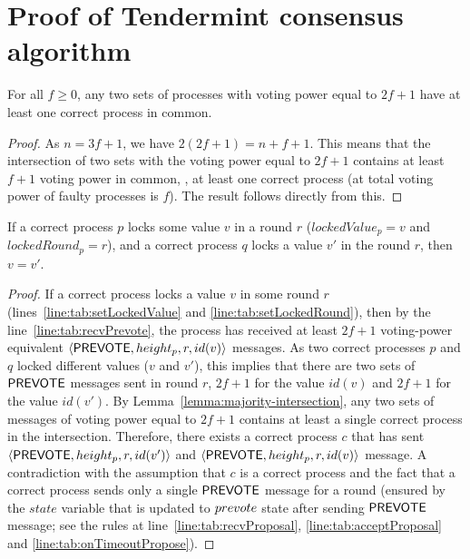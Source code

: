 \section{Proof of Tendermint consensus algorithm}
\label{sec:proof}

\begin{lemma}
	\label{lemma:majority-intersection}
	For all $f\geq 0$, any two sets of processes with voting power equal to $2f+1$ have
	at least one correct process in common.
\end{lemma}

\begin{proof}
	As $n=3f+1$, we have $2(2f+1) = n+f+1$.
	This means that the intersection of two sets with the voting power equal to $2f+1$ contains at least $f+1$ voting power in common, \ie, at least one correct process (at total voting power of faulty processes is $f$). The result follows directly from this.
\end{proof}

\begin{lemma}
	\label{lemma:locking-value}
	If a correct process $p$ locks some value $v$ in a round $r$ ($lockedValue_p = v$ and $lockedRound_p = r$), and a correct process $q$ locks a value $v'$ in the round $r$, then $v = v'$.
\end{lemma}

\begin{proof}
If a correct process locks a value $v$ in some round $r$ (lines~\ref{line:tab:setLockedValue} and \ref{line:tab:setLockedRound}), then by the line~\ref{line:tab:recvPrevote}, the process has received at least $2f+1$ voting-power equivalent $\langle\mathsf{PREVOTE},height_p, r,id(v)\rangle$ messages. As two correct processes $p$ and $q$ locked different values ($v$ and $v'$), this implies that there are two sets of $\mathsf{PREVOTE}$ messages sent in round $r$, $2f+1$ for the value $id(v)$ and $2f+1$ for the value $id(v')$. By Lemma~\ref{lemma:majority-intersection}, any two sets of messages of voting power equal to $2f+1$ contains at least a single correct process in the intersection. Therefore, there exists a correct process $c$ that has sent $\langle\mathsf{PREVOTE},height_p, r,id(v')\rangle$ and $\langle\mathsf{PREVOTE},height_p, r,id(v)\rangle$ message. A contradiction with the assumption that $c$ is a correct process and the fact that a correct process sends only a single $\mathsf{PREVOTE}$ message for a round (ensured by the $state$ variable that is updated to $prevote$ state after sending $\mathsf{PREVOTE}$ message; see the rules at line~\ref{line:tab:recvProposal}, \ref{line:tab:acceptProposal} and \ref{line:tab:onTimeoutPropose}). 	
\end{proof}

